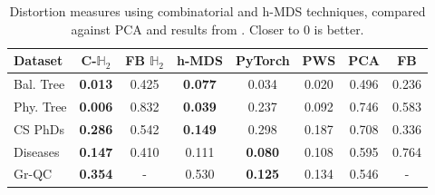 \begin{table}[h]
\centering
\begin{tabular}{|l||c|c||c|c|c|c|c|} \hline
  Dataset     	          &  C-$\mathbb{H}_2$ &  FB $\mathbb{H}_2$ & h-MDS & PyTorch & PWS & PCA & FB                  \\ \hline\hline
  Bal. Tree         & {\bf 0.013}         &      0.425               &    {\bf 0.077}     & 0.034 & 0.020   &  0.496    & 0.236 \\ 
  Phy. Tree          & {\bf 0.006}             &     0.832               &  {\bf   0.039}    & 0.237 & 0.092 &   0.746        &       0.583     \\
\hline \hline
CS PhDs              & {\bf 0.286}    &   0.542                           &  {\bf 0.149}  & 0.298 & 0.187   &  0.708  & 0.336   \\ 
\hline\hline 
Diseases              & {\bf 0.147}    &    0.410                          &  0.111  & {\bf 0.080} &  0.108   &    0.595 &  0.764              \\ \hline 
Gr-QC               & {\bf 0.354}    &   -                               & 0.530  & {\bf 0.125} & 0.134 &   0.546 &   -\\ \hline 

  
\end{tabular}
\caption{Distortion measures using combinatorial and h-MDS techniques, compared against PCA and results from \citet{fb}. Closer to 0 is better.}
\label{table:distortion_results}
\end{table}

